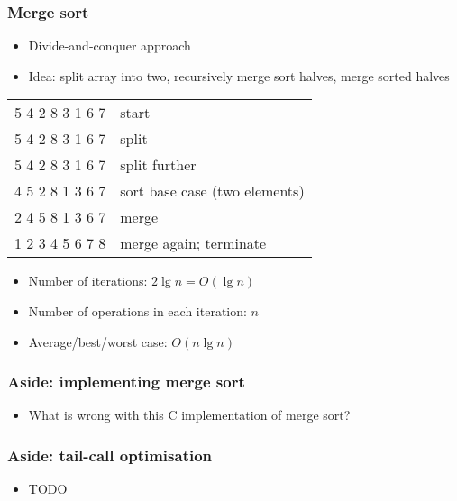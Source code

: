 \documentclass{beamer}
\begin{document}
\begin{frame}
 \frametitle{Merge sort}
 \begin{itemize}
  \item Divide-and-conquer approach
  \item Idea: split array into two, recursively merge sort halves, merge
        sorted halves
 \end{itemize}
 \begin{center}
 \begin{tabular}{cl}
  5 4 2 8 3 1 6 7 & start \pause \\
  5 4 2 8 \hspace{0.5cm}  3 1 6 7 & split \pause \\
  5 4 \hspace{0.5cm} 2 8 \hspace{0.5cm} 3 1 \hspace{0.5cm} 6 7 & split further \pause \\
  4 5 \hspace{0.5cm} 2 8 \hspace{0.5cm} 1 3 \hspace{0.5cm} 6 7 & sort base case (two elements) \pause \\
  2 4 5 8 \hspace{0.5cm} 1 3 6 7 & merge \pause \\
  1 2 3 4 5 6 7 8 & merge again; terminate \pause \\
 \end{tabular}
 \end{center}
 \begin{itemize}
  \item Number of iterations: $2 \lg n = O(\lg n)$
  \item Number of operations in each iteration: $n$
  \item Average/best/worst case: $O(n \lg n)$
 \end{itemize}
\end{frame}

\begin{frame}
 \frametitle{Aside: implementing merge sort}
 \begin{itemize}
  \item What is wrong with this C implementation of merge sort?
 \end{itemize}
\end{frame}

\begin{frame}
 \frametitle{Aside: tail-call optimisation}
 \begin{itemize}
  \item TODO
 \end{itemize}
\end{frame}
\end{document}
